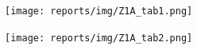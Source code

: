 \documentclass{article}
\begin{document}
            \begin{center}
                \texttt{[image: reports/img/Z1A\_tab1.png]}\\
            \end{center}
            \begin{center}
                \texttt{[image: reports/img/Z1A\_tab2.png]}\\
            \end{center}
\end{document}
